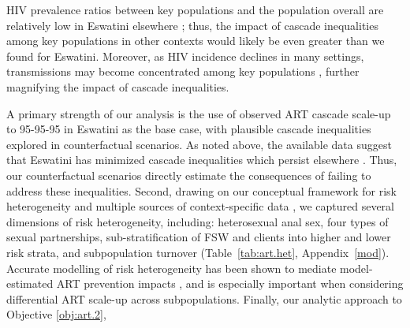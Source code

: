 HIV prevalence ratios between key populations and the population overall
are relatively low in Eswatini \vs elsewhere \cite{Baral2012,Hessou2019};
thus, the impact of cascade inequalities among key populations in other contexts
would likely be even greater than we found for Eswatini.
Moreover, as HIV incidence declines in many settings,
transmissions may become concentrated among key populations \cite{Brown2019,Garnett2021},
further magnifying the impact of cascade inequalities.
\par
A primary strength of our analysis is the use of
observed ART cascade scale-up to 95-95-95 in Eswatini as the base case,
with plausible cascade inequalities explored in counterfactual scenarios.
As noted above, the available data suggest that Eswatini has
minimized cascade inequalities which persist elsewhere \cite{Hakim2018}.
Thus, our counterfactual scenarios directly estimate
the consequences of failing to address these inequalities.
Second, drawing on our conceptual framework for risk heterogeneity \cite[Table~1]{Knight2022sr}
and multiple sources of context-specific data
\cite{SDHS2006,SHIMS1,SHIMS2,Baral2014,EswKP2014,EswIBBS2022},
we captured several dimensions of risk heterogeneity, including:
heterosexual anal sex,
four types of sexual partnerships,
sub-stratification of FSW and clients into higher and lower risk strata,
and subpopulation turnover
(Table~\ref{tab:art.het}, Appendix~\ref{mod}).
Accurate modelling of risk heterogeneity
has been shown to mediate model-estimated ART prevention impacts \cite{Hontelez2013},
and is especially important when considering differential ART scale-up across subpopulations.
Finally, our analytic approach to Objective \ref{obj:art.2},
